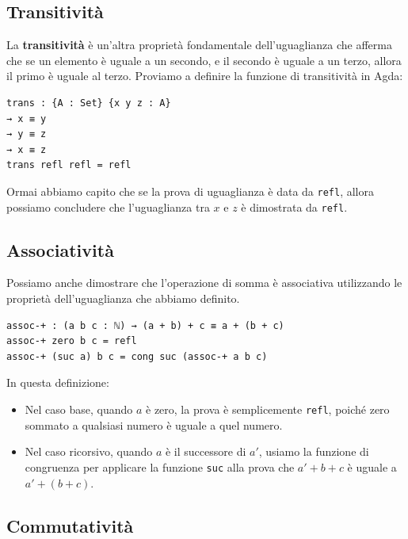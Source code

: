 \documentclass[a4paper]{article}
\theoremstyle{definition}
\theoremstyle{remark}
\begin{document}
\subsection{Transitività}

La \textbf{transitività} è un'altra proprietà fondamentale dell'uguaglianza che afferma che se un elemento è uguale a un secondo, e il secondo è uguale a un terzo, allora il primo è uguale al terzo.
Proviamo a definire la funzione di transitività in Agda:

\begin{verbatim}
trans : {A : Set} {x y z : A}
→ x ≡ y
→ y ≡ z
→ x ≡ z
trans refl refl = refl
\end{verbatim}
Ormai abbiamo capito che se la prova di uguaglianza è data da \texttt{refl}, allora possiamo concludere che l'uguaglianza tra \( x \) e \( z \) è dimostrata da \texttt{refl}.
\subsection{Associatività}
Possiamo anche dimostrare che l'operazione di somma è associativa utilizzando le proprietà dell'uguaglianza che abbiamo definito.
\begin{verbatim}
assoc-+ : (a b c : ℕ) → (a + b) + c ≡ a + (b + c)
assoc-+ zero b c = refl
assoc-+ (suc a) b c = cong suc (assoc-+ a b c)
\end{verbatim}
In questa definizione:
\begin{itemize}
  \item Nel caso base, quando \( a \) è zero, la prova è semplicemente \texttt{refl}, poiché zero sommato a qualsiasi numero è uguale a quel numero.
  \item Nel caso ricorsivo, quando \( a \) è il successore di \( a' \), usiamo la funzione di congruenza per applicare la funzione \texttt{suc} alla prova che \( a' + b + c \) è uguale a \( a' + (b + c) \).
\end{itemize}
\subsection{Commutatività}
\end{document}

